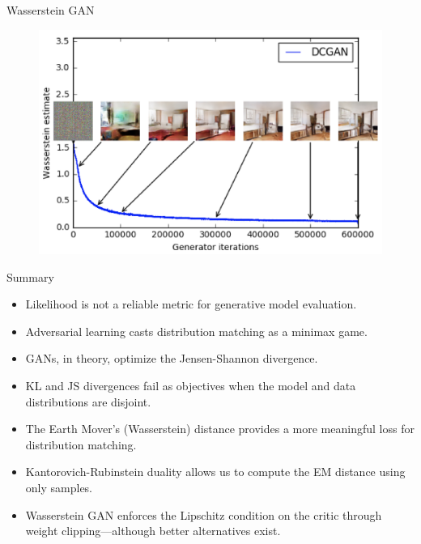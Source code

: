 \documentclass{beamer}
\begin{document}
\begin{frame}{Wasserstein GAN}
\begin{minipage}[t]{0.5\columnwidth}
\begin{figure}
		\end{figure}
	\end{minipage}%
	\begin{minipage}[t]{0.5\columnwidth}
		\begin{figure}
			\centering
			\includegraphics[width=0.95\linewidth]{figs/wgan_quality}
		\end{figure}
	\end{minipage}
\end{frame}
\begin{frame}{Summary}
	\begin{itemize}
		\item Likelihood is not a reliable metric for generative model evaluation.		
		\vfill
		\item Adversarial learning casts distribution matching as a minimax game.
		\vfill
		\item GANs, in theory, optimize the Jensen-Shannon divergence.
		\vfill
		\item KL and JS divergences fail as objectives when the model and data distributions are disjoint.
		\vfill
		\item The Earth Mover's (Wasserstein) distance provides a more meaningful loss for distribution matching.
		\vfill
		\item Kantorovich-Rubinstein duality allows us to compute the EM distance using only samples.
		\vfill
		\item Wasserstein GAN enforces the Lipschitz condition on the critic through weight clipping---although better alternatives exist.
	\end{itemize}
\end{frame}
\end{document}
